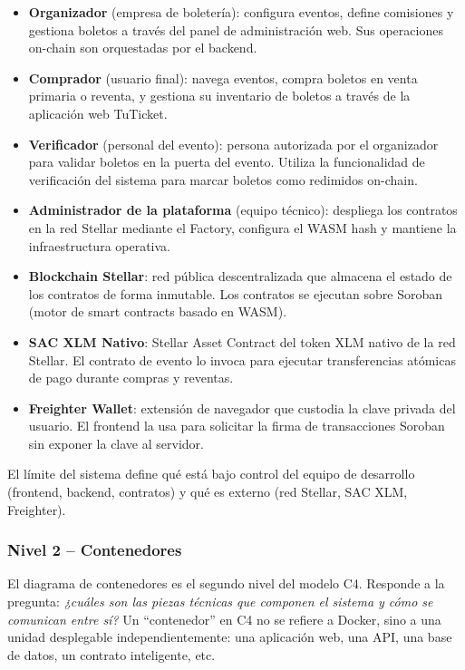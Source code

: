 \documentclass[12pt,oneside]{article}
\begin{document}
\begin{itemize}
  \item \textbf{Organizador} (empresa de boletería): configura eventos, define comisiones y gestiona boletos a través del panel de administración web. Sus operaciones on-chain son orquestadas por el backend.
  \item \textbf{Comprador} (usuario final): navega eventos, compra boletos en venta primaria o reventa, y gestiona su inventario de boletos a través de la aplicación web TuTicket.
  \item \textbf{Verificador} (personal del evento): persona autorizada por el organizador para validar boletos en la puerta del evento. Utiliza la funcionalidad de verificación del sistema para marcar boletos como redimidos on-chain.
  \item \textbf{Administrador de la plataforma} (equipo técnico): despliega los contratos en la red Stellar mediante el Factory, configura el WASM hash y mantiene la infraestructura operativa.
  \item \textbf{Blockchain Stellar}: red pública descentralizada que almacena el estado de los contratos de forma inmutable. Los contratos se ejecutan sobre Soroban (motor de smart contracts basado en WASM).
  \item \textbf{SAC XLM Nativo}: Stellar Asset Contract del token XLM nativo de la red Stellar. El contrato de evento lo invoca para ejecutar transferencias atómicas de pago durante compras y reventas.
  \item \textbf{Freighter Wallet}: extensión de navegador que custodia la clave privada del usuario. El frontend la usa para solicitar la firma de transacciones Soroban sin exponer la clave al servidor.
\end{itemize}

El límite del sistema define qué está bajo control del equipo de desarrollo (frontend, backend, contratos) y qué es externo (red Stellar, SAC XLM, Freighter).

\subsubsection{Nivel 2 -- Contenedores}

El diagrama de contenedores es el segundo nivel del modelo C4. Responde a la pregunta: \textit{¿cuáles son las piezas técnicas que componen el sistema y cómo se comunican entre sí?} Un ``contenedor'' en C4 no se refiere a Docker, sino a una unidad desplegable independientemente: una aplicación web, una API, una base de datos, un contrato inteligente, etc.
\end{document}
